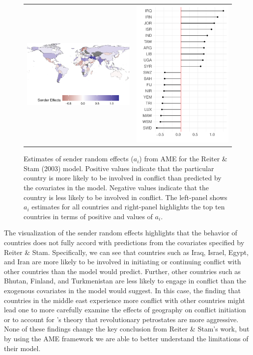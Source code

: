 \begin{figure}[ht]
	\begin{tabular}{cc}
	\includegraphics[width=.7\textwidth]{graphics/figure7a.pdf} &
	\includegraphics[width=.3\textwidth]{graphics/figure7b.pdf} \\
	\end{tabular}
	\caption{Estimates of sender random effects ($a_{i}$) from AME for the Reiter \& Stam (2003) model. Positive values indicate that the particular country is more likely to be involved in conflict than predicted by the covariates in the model. Negative values indicate that the country is less likely to be involved in conflict. The left-panel shows $a_{i}$ estimates for all countries and right-panel highlights the top ten countries in terms of positive and values of $a_{i}$.}
	\label{fig:reiter_stam_aEff}
\end{figure}
\FloatBarrier

The visualization of the sender random effects highlights that the behavior of countries does not fully accord with predictions from the covariates specified by Reiter \& Stam. Specifically, we can see that countries such as Iraq, Israel, Egypt, and Iran are more likely to be involved in initiating or continuing conflict with other countries than the model would predict. Further, other countries such as Bhutan, Finland, and Turkmenistan are less likely to engage in conflict than the exogenous covariates in the model would suggest. In this case, the finding that countries in the middle east experience more conflict with other countries might lead one to more carefully examine the effects of geography on conflict initiation or to account for \citet{colgan:2010}'s theory that revolutionary petrostates are more aggressive. None of these findings change the key conclusion from Reiter \& Stam's work, but by using the AME framework we are able to better understand the limitations of their model.

